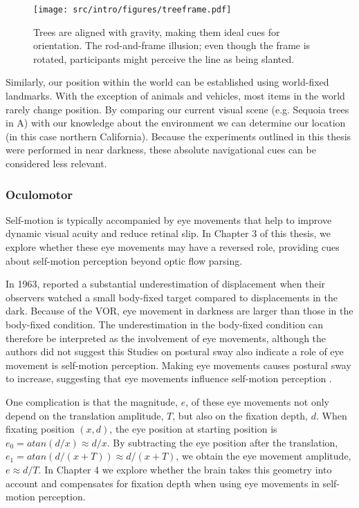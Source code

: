 \begin{figure}
	\texttt{[image: src/intro/figures/treeframe.pdf]}
	\caption{ Trees are aligned with gravity, making them ideal cues for orientation.  The rod-and-frame illusion; even though the frame is rotated, participants might perceive the line as being slanted.}
	\label{intro:fig:treeframe}
\end{figure}

Similarly, our position within the world can be established using world-fixed landmarks. With the exception of animals and vehicles, most items in the world rarely change position. By comparing our current visual scene (e.g. Sequoia trees in A) with our knowledge about the environment we can determine our location (in this case northern California). Because the experiments outlined in this thesis were performed in near darkness, these absolute navigational cues can be considered less relevant. 


\subsubsection{Oculomotor}
Self-motion is typically accompanied by eye movements that help to improve dynamic visual acuity and reduce retinal slip. In Chapter 3 of this thesis, we explore whether these eye movements may have a reversed role, providing cues about self-motion perception beyond optic flow parsing. 

In 1963, \citeauthor{guedry1963} reported a substantial underestimation of displacement when their observers watched a small body-fixed target compared to displacements in the dark. Because of the VOR, eye movement in darkness are larger than those in the body-fixed condition. The underestimation in the body-fixed condition can therefore be interpreted as the involvement of eye movements, although the authors did not suggest this 
Studies on postural sway also indicate a role of eye movement is self-motion perception. Making eye movements causes postural sway to increase, suggesting that eye movements influence self-motion perception \cite{glasauer2005,rodrigues2015}.

One complication is that the magnitude, $e$, of these eye movements not only depend on the translation amplitude, $T$, but also on the fixation depth, $d$. When fixating position $(x, d)$, the eye position at starting position is $e_0 = atan(d/x) \approx d/x$. By subtracting the eye position after the translation, $e_1 = atan(d/(x+T)) \approx d/(x+T)$, we obtain the eye movement amplitude, $e \approx d/T$. In Chapter 4 we explore whether the brain takes this geometry into account and compensates for fixation depth when using eye movements in self-motion perception.


